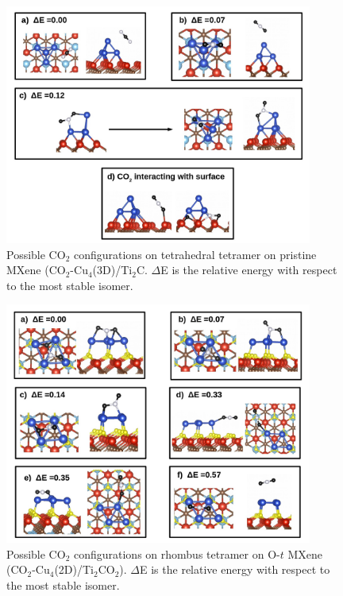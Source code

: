 \begin{figure}[htb]
  \begin{center}
    \includegraphics[width=0.9\textwidth]{./Appendix2/Appendix2_figures/photo14.jpg}
  \end{center}
\caption{Possible CO$_2$ configurations on tetrahedral tetramer on pristine MXene (CO$_2$-Cu$_4$(3D)/Ti$_2$C. $\Delta$E is the relative energy with respect to the most stable isomer.}
  \label{fig-014}
\end{figure}

\begin{figure}[htb]
  \begin{center}
    \includegraphics[width=0.9\textwidth]{./Appendix2/Appendix2_figures/photo16.jpg}
  \end{center}
\caption{Possible CO$_2$ configurations on rhombus tetramer on O-$t$ MXene (CO$_2$-Cu$_4$(2D)/Ti$_2$CO$_2$). $\Delta$E is the relative energy with respect to the most stable isomer.}
  \label{fig-016}
\end{figure}


